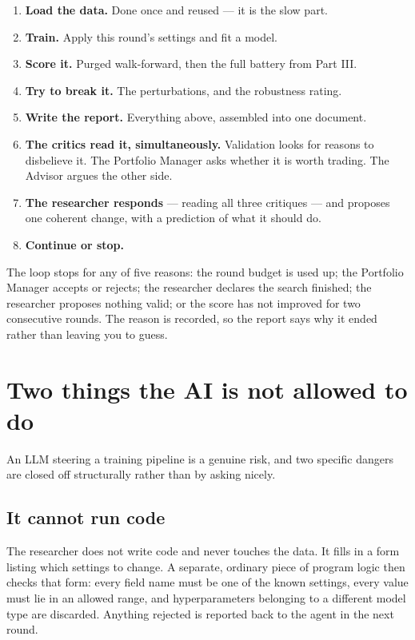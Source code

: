 \documentclass[11pt]{article}
\begin{document}
\begin{enumerate}
  \item \textbf{Load the data.} Done once and reused --- it is the slow part.
  \item \textbf{Train.} Apply this round's settings and fit a model.
  \item \textbf{Score it.} Purged walk-forward, then the full battery from Part III.
  \item \textbf{Try to break it.} The perturbations, and the robustness rating.
  \item \textbf{Write the report.} Everything above, assembled into one document.
  \item \textbf{The critics read it, simultaneously.} Validation looks for reasons to
        disbelieve it. The Portfolio Manager asks whether it is worth trading. The
        Advisor argues the other side.
  \item \textbf{The researcher responds} --- reading all three critiques --- and proposes
        one coherent change, with a prediction of what it should do.
  \item \textbf{Continue or stop.}
\end{enumerate}

The loop stops for any of five reasons: the round budget is used up; the Portfolio
Manager accepts or rejects; the researcher declares the search finished; the researcher
proposes nothing valid; or the score has not improved for two consecutive rounds. The
reason is recorded, so the report says why it ended rather than leaving you to guess.

\section{Two things the AI is not allowed to do}

An LLM steering a training pipeline is a genuine risk, and two specific dangers are
closed off structurally rather than by asking nicely.

\subsection*{It cannot run code}

The researcher does not write code and never touches the data. It fills in a form
listing which settings to change. A separate, ordinary piece of program logic then
checks that form: every field name must be one of the known settings, every value must
lie in an allowed range, and hyperparameters belonging to a different model type are
discarded. Anything rejected is reported back to the agent in the next round.
\end{document}
